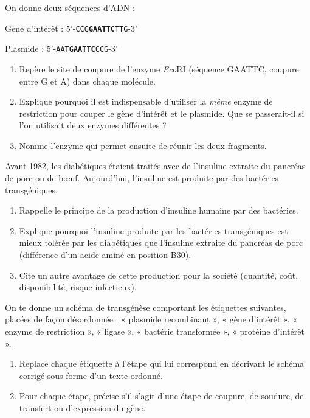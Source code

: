 \documentclass[11pt]{article}
\begin{document}
\begin{exercice}
On donne deux séquences d'ADN :

Gène d'intérêt : 5'-\texttt{CCG\textbf{GAATTC}TTG}-3'

Plasmide : 5'-\texttt{AAT\textbf{GAATTC}CCG}-3'
\begin{enumerate}
\item Repère le site de coupure de l'enzyme \emph{Eco}RI (séquence GAATTC, coupure entre G et A) dans chaque molécule.
\item Explique pourquoi il est indispensable d'utiliser la \emph{même} enzyme de restriction pour couper le gène d'intérêt et le plasmide. Que se passerait-il si l'on utilisait deux enzymes différentes ?
\item Nomme l'enzyme qui permet ensuite de réunir les deux fragments.
\end{enumerate}
\end{exercice}

\begin{exercice}
Avant 1982, les diabétiques étaient traités avec de l'insuline extraite du pancréas de porc ou de bœuf. Aujourd'hui, l'insuline est produite par des bactéries transgéniques.
\begin{enumerate}
\item Rappelle le principe de la production d'insuline humaine par des bactéries.
\item Explique pourquoi l'insuline produite par les bactéries transgéniques est mieux tolérée par les diabétiques que l'insuline extraite du pancréas de porc (différence d'un acide aminé en position B30).
\item Cite un autre avantage de cette production pour la société (quantité, coût, disponibilité, risque infectieux).
\end{enumerate}
\end{exercice}

\begin{exercice}
On te donne un schéma de transgénèse comportant les étiquettes suivantes, placées de façon désordonnée : « plasmide recombinant », « gène d'intérêt », « enzyme de restriction », « ligase », « bactérie transformée », « protéine d'intérêt ».
\begin{enumerate}
\item Replace chaque étiquette à l'étape qui lui correspond en décrivant le schéma corrigé sous forme d'un texte ordonné.
\item Pour chaque étape, précise s'il s'agit d'une étape de coupure, de soudure, de transfert ou d'expression du gène.
\end{enumerate}
\end{exercice}
\end{document}
